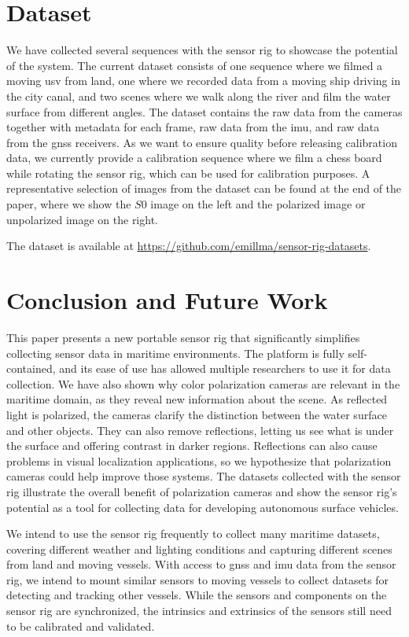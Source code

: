 

\section{Dataset}
We have collected several sequences with the sensor rig to showcase the potential of the system.
The current dataset consists of one sequence where we filmed a moving \gls{usv} from land, one where we recorded data from a moving ship driving in the city canal, and two scenes where we walk along the river and film the water surface from different angles.
The dataset contains the raw data from the cameras together with metadata for each frame, raw data from the \gls{imu}, and raw data from the \gls{gnss} receivers.
As we want to ensure quality before releasing calibration data, we currently provide a calibration sequence where we film a chess board while rotating the sensor rig, which can be used for calibration purposes.
A representative selection of images from the dataset can be found at the end of the paper, where we show the $S0$ image on the left and the polarized image or unpolarized image on the right.

The dataset is available at \url{https://github.com/emillma/sensor-rig-datasets}.

\section{Conclusion and Future Work}
This paper presents a new portable sensor rig that significantly simplifies collecting sensor data in maritime environments.
The platform is fully self-contained, and its ease of use has allowed multiple researchers to use it for data collection.
We have also shown why color polarization cameras are relevant in the maritime domain, as they reveal new information about the scene.
As reflected light is polarized, the cameras clarify the distinction between the water surface and other objects. They can also remove reflections, letting us see what is under the surface and offering contrast in darker regions.
Reflections can also cause problems in visual localization applications, so we hypothesize that polarization cameras could help improve those systems.
The datasets collected with the sensor rig illustrate the overall benefit of polarization cameras and show the sensor rig's potential as a tool for collecting data for developing autonomous surface vehicles.

We intend to use the sensor rig frequently to collect many maritime datasets, covering different weather and lighting conditions and capturing different scenes from land and moving vessels.
With access to \gls{gnss} and \gls{imu} data from the sensor rig, we intend to mount similar sensors to moving vessels to collect datasets for detecting and tracking other vessels.
While the sensors and components on the sensor rig are synchronized, the intrinsics and extrinsics of the sensors still need to be calibrated and validated.

